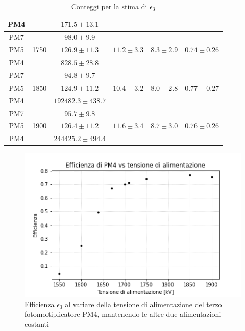 \documentclass{article}
\begin{document}
\begin{table}[H]
\begin{tabular}{|c|c|c|c|c|c|}
PM4 & & $171.5 \pm 13.1$ &  & &\\ 
\hline 
PM7 & & $98.0 \pm 9.9$ &  & & \\ 
PM5 & 1750 & $126.9 \pm 11.3$ & $11.2 \pm 3.3$  & $8.3 \pm 2.9$& $0.74 \pm 0.26$\\ 
PM4 & & $828.5 \pm 28.8$ &  & &\\ 
\hline 
PM7 & & $94.8 \pm 9.7$ &  & & \\ 
PM5 & 1850 & $124.9 \pm 11.2$ & $10.4 \pm 3.2$  & $8.0 \pm 2.8$& $0.77 \pm 0.27$\\ 
PM4 & & $192482.3 \pm 438.7$ &  & &\\ 
\hline 
PM7 & & $95.7 \pm 9.8$ &  & & \\ 
PM5 & 1900 & $126.4 \pm 11.2$ & $11.6 \pm 3.4$  & $8.7 \pm 3.0$& $0.76 \pm 0.26$\\ 
PM4 & & $244425.2 \pm 494.4$ &  & &\\ 
\hline
\end{tabular}
\caption{Conteggi per la stima di $\epsilon_3$}\label{tabepsilon3}
\end{table}

\begin{figure}[h!]
\begin{center}
\includegraphics[scale=0.7]{Grafici/epsilon_vs_alimentazione_PM4.png}
\caption{Efficienza $\epsilon_3$ al variare della tensione di alimentazione del terzo fotomoltiplicatore PM4, mantenendo le altre due alimentazioni costanti} \label{fepsilon2}
\end{center}
\end{figure}
\end{document}
